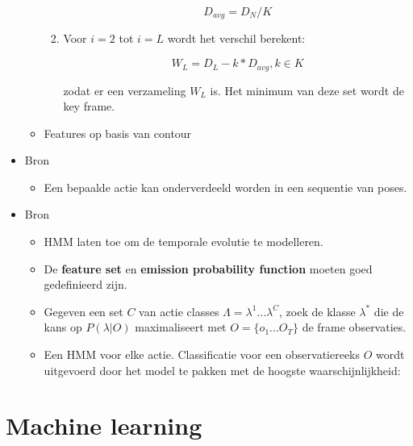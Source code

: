 \begin{itemize}
\begin{itemize}
\begin{enumerate}
			$$D_{avg} = D_N / K$$
			
			\item Voor $i = 2$ tot $i = L$ wordt het verschil berekent:
			
			$$W_L = D_L - k * D_{avg}, k \in K$$
			
			zodat er een verzameling ${W_L}$ is. Het minimum van deze set wordt de key frame.
		\end{enumerate}
		\item Features op basis van contour
	\end{itemize}

	\item Bron \cite{Carlsson2001}
	\begin{itemize}
		\item Een bepaalde actie kan onderverdeeld worden in een sequentie van poses.
	\end{itemize}	

	\item Bron \cite{Vezzani2010}
	\begin{itemize}
		\item HMM laten toe om de temporale evolutie te modelleren.
		\item De \textbf{feature set} en \textbf{emission probability function} moeten goed gedefinieerd zijn. 
		\item Gegeven een set $C$ van actie classes $\Lambda = \lambda^1 ... \lambda^C$, zoek de klasse $\lambda^*$ die de kans op $P(\lambda|O)$ maximaliseert met $O = \{o_1 ... O_T\}$ de frame observaties.
		\item Een HMM voor elke actie. Classificatie voor een observatiereeks $O$ wordt uitgevoerd door het model te pakken met de hoogste waarschijnlijkheid:
	\end{itemize}
\end{itemize}



\chapter{Machine learning}
